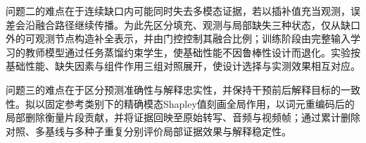 问题二的难点在于连续缺口内可能同时失去多模态证据，若以插补值充当观测，误差会沿融合路径继续传播。为此先区分填充、观测与局部缺失三种状态，仅从缺口外的可观测节点构造补全表示，并由门控控制其融合比例；训练阶段由完整输入学习的教师模型通过任务蒸馏约束学生，使基础性能不因鲁棒性设计而退化。实验按基础性能、缺失因素与组件作用三组对照展开，使设计选择与实测效果相互对应。

问题三的难点在于区分预测准确性与解释忠实性，并保持干预前后解释目标的一致性。拟以固定参考类别下的精确模态Shapley值刻画全局作用，以词元重编码后的局部删除衡量片段贡献，并将证据回映至原始转写、音频与视频帧；通过累计删除对照、多基线与多种子重复分别评价局部证据效果与解释稳定性。
